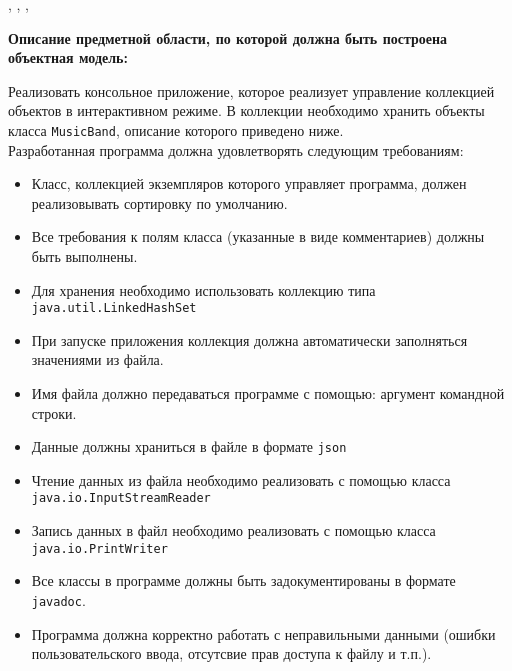 \newpage
\Chapter{\lab\ \labnumber}{\labtheme}

\begin{center}
, , ,
\end{center}
\noindent
\textbf{
    Описание предметной области, по которой должна быть построена объектная модель:
}

Реализовать консольное приложение, которое реализует управление коллекцией объектов в интерактивном режиме. В коллекции необходимо хранить объекты класса \verb|MusicBand|, описание которого приведено ниже.\\

Разработанная программа должна удовлетворять следующим требованиям:\\
\begin{itemize}
\setlength{\itemsep}{0pt}
    \setlength{\parskip}{0pt}
    \setlength{\parsep}{0pt}
\item Класс, коллекцией экземпляров которого управляет программа, должен реализовывать сортировку по умолчанию.

\item Все требования к полям класса (указанные в виде комментариев) должны быть выполнены.
\item Для хранения необходимо использовать коллекцию типа \verb|java.util.LinkedHashSet|
\item При запуске приложения коллекция должна автоматически заполняться значениями из файла.
\item Имя файла должно передаваться программе с помощью: аргумент командной строки.
\item Данные должны храниться в файле в формате \verb|json|
\item Чтение данных из файла необходимо реализовать с помощью класса \verb|java.io.InputStreamReader|
\item Запись данных в файл необходимо реализовать с помощью класса \verb|java.io.PrintWriter|
\item Все классы в программе должны быть задокументированы в формате \verb|javadoc|.
\item Программа должна корректно работать с неправильными данными (ошибки пользовательского ввода, отсутсвие прав доступа к файлу и т.п.).
\end{itemize}

